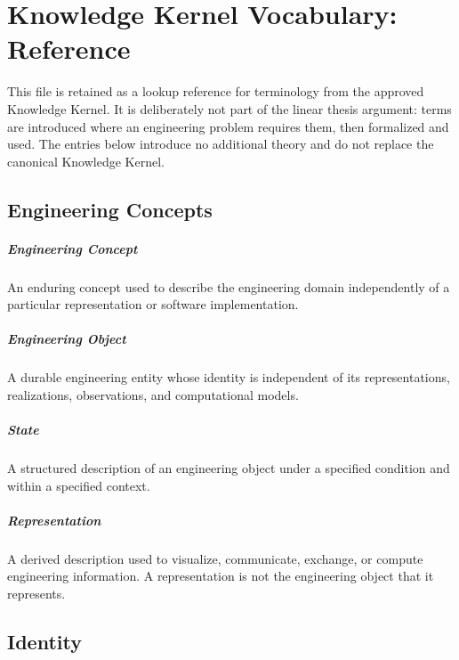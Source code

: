 
\chapter*{Knowledge Kernel Vocabulary: Reference}
\label{chap:kernel-vocabulary}

\newcommand{\kernelterm}[2]{%
\paragraph{#1}
#2\par\vspace{0.7em}
}

This file is retained as a lookup reference for terminology from the
approved Knowledge Kernel. It is deliberately not part of the linear
thesis argument: terms are introduced where an engineering problem
requires them, then formalized and used. The entries below introduce no
additional theory and do not replace the canonical Knowledge Kernel.

\section*{Engineering Concepts}

\kernelterm{Engineering Concept}
{An enduring concept used to describe the engineering domain
independently of a particular representation or software
implementation.}

\kernelterm{Engineering Object}
{A durable engineering entity whose identity is independent of its
representations, realizations, observations, and computational models.}

\kernelterm{State}
{A structured description of an engineering object under a specified
condition and within a specified context.}

\kernelterm{Representation}
{A derived description used to visualize, communicate, exchange, or
compute engineering information. A representation is not the
engineering object that it represents.}

\section*{Identity}

